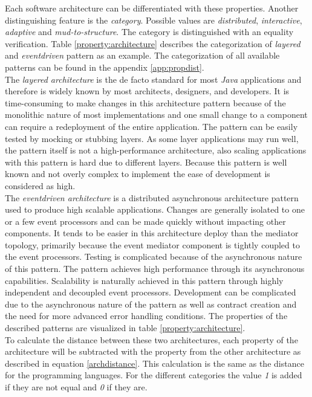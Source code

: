 Each software architecture can be differentiated with these properties. Another distinguishing feature is the \textit{category}. Possible values are \textit{distributed}, \textit{interactive}, \textit{adaptive} and \textit{mud-to-structure}. The category is distinguished with an equality verification. Table \ref{property:architecture} describes the categorization of \textit{layered} and \textit{eventdriven} pattern as an example. The categorization of all available patterns can be found in the appendix \ref{app:propdist}.\\
The \textit{layered architecture} is the de facto standard for most \textit{Java} applications and therefore is widely known by most architects, designers, and developers. It is time-consuming to make changes in this architecture pattern because of the monolithic nature of most implementations and one small change to a component can require a redeployment of the entire application. The pattern can be easily tested by mocking or stubbing layers. As some layer applications may run well, the pattern itself is not a high-performance architecture, also scaling applications with this pattern is hard due to different layers. Because this pattern is well known and not overly complex to implement the ease of development is considered as high.\\
The \textit{eventdriven architecture} is a distributed asynchronous architecture pattern used to produce high scalable applications. Changes are generally isolated to one or a few event processors and can be made quickly without impacting other components. It tends to be easier in this architecture deploy than the mediator topology, primarily because the event mediator component is tightly coupled to the event processors. Testing is complicated because of the asynchronous nature of this pattern. The pattern achieves high performance through its asynchronous capabilities. Scalability is naturally achieved in this pattern through highly independent and decoupled event processors. Development can be complicated due to the asynchronous nature of the pattern as well as contract creation and the need for more advanced error handling conditions. The properties of the described patterns are visualized in table \ref{property:architecture}.\\
To calculate the distance between these two architectures, each property of the architecture will be subtracted with the property from the other architecture as described in equation \ref{archdistance}. This calculation is the same as the distance for the programming languages. For the different categories the value \textit{1} is added if they are not equal and \textit{0} if they are. 
